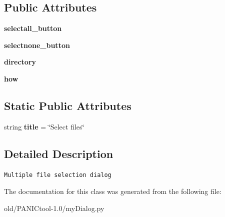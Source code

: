 \subsection*{Public Attributes}
\begin{CompactItemize}
\item 
\textbf{selectall\_\-button}\label{classmyDialog_1_1LoadFITSFilesDialog_c416979542b02808c45933190a7e43be}

\item 
\textbf{selectnone\_\-button}\label{classmyDialog_1_1LoadFITSFilesDialog_db1d772b7f46c9271a445c92c6c15d22}

\item 
\textbf{directory}\label{classmyDialog_1_1LoadFITSFilesDialog_bb49848ee210e1ec678bdc9a29385537}

\item 
\textbf{how}\label{classmyDialog_1_1LoadFITSFilesDialog_e433b3f85703307d16b6b5a6481d8061}

\end{CompactItemize}
\subsection*{Static Public Attributes}
\begin{CompactItemize}
\item 
string \textbf{title} = \char`\"{}Select files\char`\"{}\label{classmyDialog_1_1LoadFITSFilesDialog_478167eaf328864ffcbf881948650091}

\end{CompactItemize}


\subsection{Detailed Description}


\footnotesize\begin{verbatim}Multiple file selection dialog\end{verbatim}
\normalsize
 



The documentation for this class was generated from the following file:\begin{CompactItemize}
\item 
old/PANICtool-1.0/my\-Dialog.py\end{CompactItemize}

